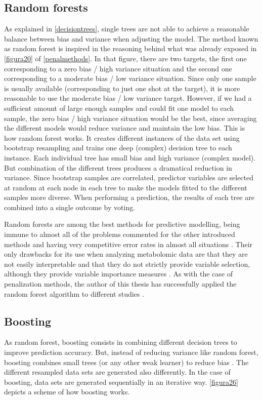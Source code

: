 \subsection{Random forests}
As explained in \autoref{decisiontrees}, single trees are not able to achieve a reasonable balance between bias and variance when adjusting the model. The method known as random forest \parencite{breiman2001random} is inspired in the reasoning behind what was already exposed in \autoref{figura20} of \autoref{penalmethods}. In that figure, there are two targets, the first one corresponding to a zero bias / high variance situation and the second one corresponding to a moderate bias / low variance situation. Since only one sample is usually available (corresponding to just one shot at the target), it is more reasonable to use the moderate bias / low variance target. However, if we had a sufficient amount of large enough samples and could fit one model to each sample, the zero bias / high variance situation would be the best, since averaging the different models would reduce variance and maintain the low bias. This is how random forest works. It creates different instances of the data set using bootstrap resampling \parencite{efron1994introduction} and trains one deep (complex) decision tree to each instance. Each individual tree has small bias and high variance (complex model). But combination of the different trees produces a dramatical reduction in variance. Since bootstrap samples are correlated, predictor variables are selected at random at each node in each tree to make the models fitted to the different samples more diverse. When performing a prediction, the results of each tree are combined into a single outcome by voting. 

Random forests are among the best methods for predictive modelling, being immune to almost all of the problems commented for the other introduced methods and having very competitive error rates in almost all situations \parencite{fernandez2014we}. Their only drawbacks for its use when analyzing metabolomic data are that they are not easily interpretable and that they do not strictly provide variable selection, although they provide variable importance measures \parencite{archer2008empirical}. As with the case of penalization methods, the author of this thesis has successfully applied the random forest algorithm to different studies \parencite{frasson2015risk, garcia2018circulating}. 

\subsection{Boosting}
As random forest, boosting consists in combining different decision trees to improve prediction accuracy. But, instead of reducing variance like random forest, boosting combines small trees (or any other weak learner) to reduce bias \parencite{freund1996experiments}. The different resampled data sets are generated also differently. In the case of boosting, data sets are generated sequentially in an iterative way. \autoref{figura26} depicts a scheme of how boosting works.

